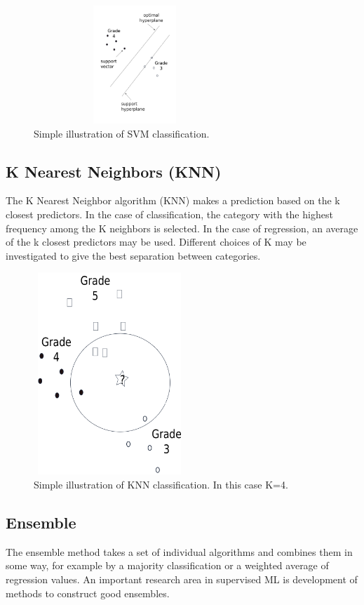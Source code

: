 \documentclass{SBCbookchapter}
\begin{document}
\begin{figure}[!htpb]
	\centering
	\includegraphics[width=3in,height=1.75in]{SimpleSVM.png}
	\caption{Simple illustration of SVM classification.}
	\label{SimpleSVM}
\end{figure}

\subsection{K Nearest Neighbors (KNN)}
The K Nearest Neighbor algorithm (KNN) makes a prediction based on the k closest predictors. In the case of classification, the category with the highest frequency among the K neighbors is selected. In the case of regression, an average of the k closest predictors may be used. Different choices of K may be investigated to give the best separation between categories.


\begin{figure}[!htpb]
	\centering
	\includegraphics[width=2.25in,height=3in]{SimpleKNN.png}
	\caption{Simple illustration of KNN classification. In this case K=4.}
	\label{SimpleSVM}
\end{figure}

\subsection{Ensemble}
The ensemble method \cite{Diet} takes a set of individual algorithms and combines them in some way, for example by a majority classification or a weighted average of regression values.  An important research area in supervised ML is development of methods to construct good ensembles.
\end{document}
